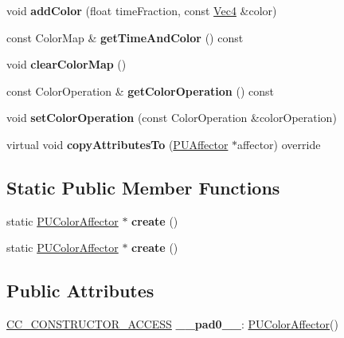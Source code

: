 \begin{DoxyCompactItemize}
void {\bfseries add\+Color} (float time\+Fraction, const \hyperlink{classVec4}{Vec4} \&color)
\item 
\mbox{\label{classPUColorAffector_a25408278d25f36e44352a6b09aa72956}} 
const Color\+Map \& {\bfseries get\+Time\+And\+Color} () const
\item 
\mbox{\label{classPUColorAffector_a0bd88d77ad37b586158a1c3a4a4ba652}} 
void {\bfseries clear\+Color\+Map} ()
\item 
\mbox{\label{classPUColorAffector_a183b265602bfe5b49ed4a70f4343e4f7}} 
const Color\+Operation \& {\bfseries get\+Color\+Operation} () const
\item 
\mbox{\label{classPUColorAffector_aadaa119df7e501c214aedf8e45d26526}} 
void {\bfseries set\+Color\+Operation} (const Color\+Operation \&color\+Operation)
\item 
\mbox{\label{classPUColorAffector_aa819ac056adfbf5bdd3822120dfecdec}} 
virtual void {\bfseries copy\+Attributes\+To} (\hyperlink{classPUAffector}{P\+U\+Affector} $\ast$affector) override
\end{DoxyCompactItemize}
\subsection*{Static Public Member Functions}
\begin{DoxyCompactItemize}
\item 
\mbox{\label{classPUColorAffector_a3948e0b1380576fccb3b3d9e3a51da93}} 
static \hyperlink{classPUColorAffector}{P\+U\+Color\+Affector} $\ast$ {\bfseries create} ()
\item 
\mbox{\label{classPUColorAffector_afd8714327ae73422c425782e627518a1}} 
static \hyperlink{classPUColorAffector}{P\+U\+Color\+Affector} $\ast$ {\bfseries create} ()
\end{DoxyCompactItemize}
\subsection*{Public Attributes}
\begin{DoxyCompactItemize}
\item 
\mbox{\label{classPUColorAffector_ade256bb09013acc3c0fbeb0b71f8ada5}} 
\hyperlink{_2cocos2d_2cocos_2base_2ccConfig_8h_a25ef1314f97c35a2ed3d029b0ead6da0}{C\+C\+\_\+\+C\+O\+N\+S\+T\+R\+U\+C\+T\+O\+R\+\_\+\+A\+C\+C\+E\+SS} {\bfseries \+\_\+\+\_\+pad0\+\_\+\+\_\+}\+: \hyperlink{classPUColorAffector}{P\+U\+Color\+Affector}()
\end{DoxyCompactItemize}
